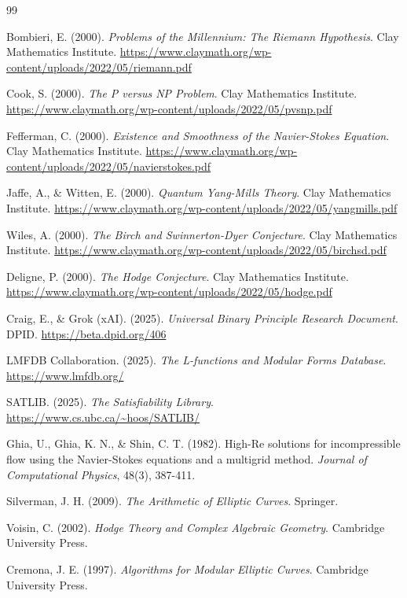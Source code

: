 \documentclass[11pt]{amsart}
\begin{document}
\begin{thebibliography}{99}

Bombieri, E. (2000). \emph{Problems of the Millennium: The Riemann Hypothesis}. Clay Mathematics Institute. \url{https://www.claymath.org/wp-content/uploads/2022/05/riemann.pdf}

Cook, S. (2000). \emph{The P versus NP Problem}. Clay Mathematics Institute. \url{https://www.claymath.org/wp-content/uploads/2022/05/pvsnp.pdf}

Fefferman, C. (2000). \emph{Existence and Smoothness of the Navier-Stokes Equation}. Clay Mathematics Institute. \url{https://www.claymath.org/wp-content/uploads/2022/05/navierstokes.pdf}

Jaffe, A., \& Witten, E. (2000). \emph{Quantum Yang-Mills Theory}. Clay Mathematics Institute. \url{https://www.claymath.org/wp-content/uploads/2022/05/yangmills.pdf}

Wiles, A. (2000). \emph{The Birch and Swinnerton-Dyer Conjecture}. Clay Mathematics Institute. \url{https://www.claymath.org/wp-content/uploads/2022/05/birchsd.pdf}

Deligne, P. (2000). \emph{The Hodge Conjecture}. Clay Mathematics Institute. \url{https://www.claymath.org/wp-content/uploads/2022/05/hodge.pdf}

Craig, E., \& Grok (xAI). (2025). \emph{Universal Binary Principle Research Document}. DPID. \url{https://beta.dpid.org/406}

LMFDB Collaboration. (2025). \emph{The L-functions and Modular Forms Database}. \url{https://www.lmfdb.org/}

SATLIB. (2025). \emph{The Satisfiability Library}. \url{https://www.cs.ubc.ca/~hoos/SATLIB/}

Ghia, U., Ghia, K. N., \& Shin, C. T. (1982). High-Re solutions for incompressible flow using the Navier-Stokes equations and a multigrid method. \emph{Journal of Computational Physics}, 48(3), 387-411.

Silverman, J. H. (2009). \emph{The Arithmetic of Elliptic Curves}. Springer.

Voisin, C. (2002). \emph{Hodge Theory and Complex Algebraic Geometry}. Cambridge University Press.

Cremona, J. E. (1997). \emph{Algorithms for Modular Elliptic Curves}. Cambridge University Press.


\end{thebibliography}
\end{document}
